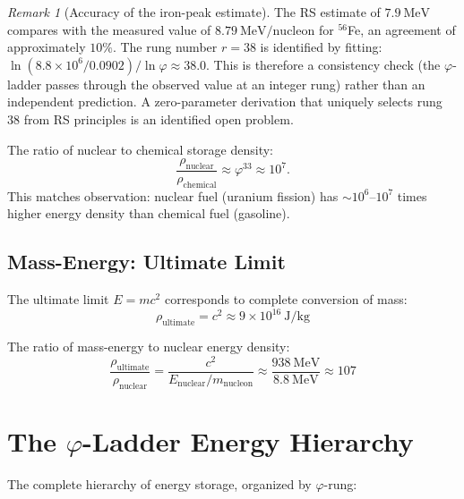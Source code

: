 \documentclass[12pt,a4paper]{article}
\theoremstyle{definition}
\theoremstyle{remark}
\newtheorem{remark}[theorem]{Remark}
\begin{document}
\begin{remark}[Accuracy of the iron-peak estimate]
The RS estimate of $7.9~\mathrm{MeV}$ compares with the measured
value of $8.79~\mathrm{MeV/nucleon}$ for $^{56}$Fe, an agreement
of approximately $10\%$.  The rung number $r = 38$ is identified
by fitting: $\ln(8.8 \times 10^6 / 0.0902) / \ln\varphi \approx 38.0$.
This is therefore a consistency check (the $\varphi$-ladder passes
through the observed value at an integer rung) rather than an
independent prediction.  A zero-parameter derivation that uniquely
selects rung 38 from RS principles is an identified open problem.
\end{remark}

The ratio of nuclear to chemical storage density:
\begin{equation}
\frac{\rho_\mathrm{nuclear}}{\rho_\mathrm{chemical}} \approx \varphi^{33} \approx 10^7.
\end{equation}
This matches observation: nuclear fuel (uranium fission) has
$\sim 10^6$--$10^7$ times higher energy density than chemical
fuel (gasoline).

\subsection{Mass-Energy: Ultimate Limit}

The ultimate limit $E = mc^2$ corresponds to complete conversion of mass:
\begin{equation}
\rho_\mathrm{ultimate} = c^2 \approx 9 \times 10^{16}~\mathrm{J/kg}
\end{equation}

The ratio of mass-energy to nuclear energy density:
\begin{equation}
\frac{\rho_\mathrm{ultimate}}{\rho_\mathrm{nuclear}} = \frac{c^2}{E_\mathrm{nuclear}/m_\mathrm{nucleon}} 
\approx \frac{938~\mathrm{MeV}}{8.8~\mathrm{MeV}} \approx 107
\end{equation}

\section{The $\varphi$-Ladder Energy Hierarchy}

The complete hierarchy of energy storage, organized by $\varphi$-rung:
\end{document}
